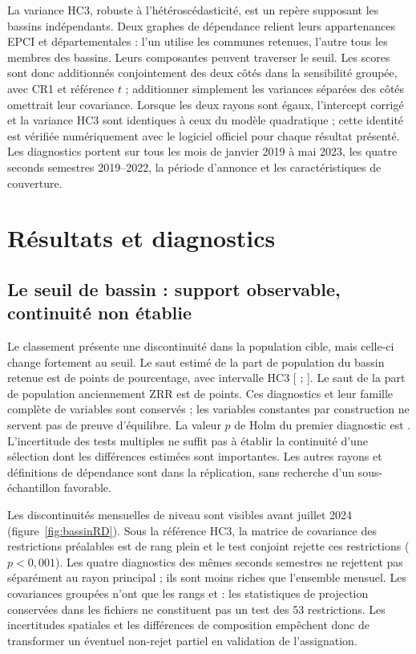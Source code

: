 La variance HC3, robuste à l’hétéroscédasticité, est un repère supposant les bassins indépendants. Deux graphes de dépendance relient leurs appartenances EPCI et départementales : l’un utilise les communes retenues, l’autre tous les membres des bassins. Leurs composantes peuvent traverser le seuil. Les scores sont donc additionnés conjointement des deux côtés dans la sensibilité groupée, avec CR1 et référence $t$ ; additionner simplement les variances séparées des côtés omettrait leur covariance. Lorsque les deux rayons sont égaux, l’intercept corrigé et la variance HC3 sont identiques à ceux du modèle quadratique ; cette identité est vérifiée numériquement avec le logiciel officiel pour chaque résultat présenté. Les diagnostics portent sur tous les mois de janvier 2019 à mai 2023, les quatre seconds semestres 2019–2022, la période d’annonce et les caractéristiques de couverture.

\section{Résultats et diagnostics}
\subsection{Le seuil de bassin : support observable, continuité non établie}
Le classement présente une discontinuité dans la population cible, mais celle-ci change fortement au seuil. Le saut estimé de la part de population du bassin retenue est de \BVRDCoverageJump{} points de pourcentage, avec intervalle HC3 [\BVRDCoverageLo{} ; \BVRDCoverageHi{}]. Le saut de la part de population anciennement ZRR est de \BVRDOldShareJump{} points. Ces diagnostics et leur famille complète de \BVRDCovariateN{} variables sont conservés ; les variables constantes par construction ne servent pas de preuve d’équilibre. La valeur $p$ de Holm du premier diagnostic est \BVRDCoverageHolmP{}. L’incertitude des tests multiples ne suffit pas à établir la continuité d’une sélection dont les différences estimées sont importantes. Les autres rayons et définitions de dépendance sont dans la réplication, sans recherche d’un sous-échantillon favorable.

Les discontinuités mensuelles de niveau sont visibles avant juillet 2024 (figure~\ref{fig:bassinRD}). Sous la référence HC3, la matrice de covariance des \BVRDPreN{} restrictions préalables est de rang plein et le test conjoint rejette ces restrictions ($p<0{,}001$). Les quatre diagnostics des mêmes seconds semestres ne rejettent pas séparément au rayon principal ; ils sont moins riches que l’ensemble mensuel. Les covariances groupées n’ont que les rangs \BVRDClusterRank{} et \BVRDFullRank{} : les statistiques de projection conservées dans les fichiers ne constituent pas un test des 53 restrictions. Les incertitudes spatiales et les différences de composition empêchent donc de transformer un éventuel non-rejet partiel en validation de l’assignation.

